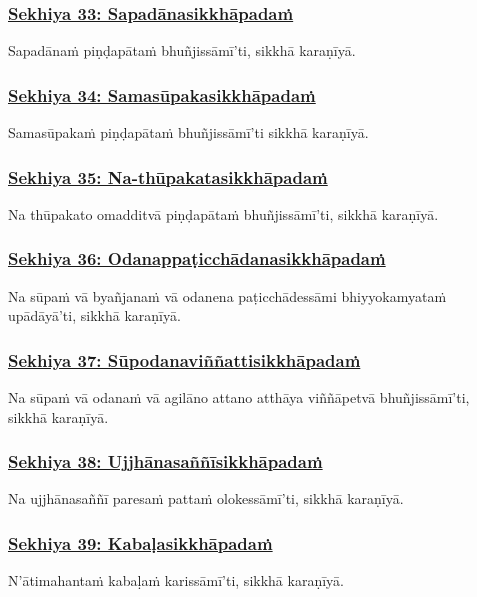 \subsubsection*{\hyperref[training33]{Sekhiya 33: Sapadānasikkhāpadaṁ}}
\label{sekh33}
Sapadānaṁ piṇḍapātaṁ bhuñjissāmī'ti, sikkhā karaṇīyā.

\subsubsection*{\hyperref[training34]{Sekhiya 34: Samasūpakasikkhāpadaṁ}}
\label{sekh34}
Samasūpakaṁ piṇḍapātaṁ bhuñjissāmī'ti sikkhā karaṇīyā.

\subsubsection*{\hyperref[training35]{Sekhiya 35: Na-thūpakatasikkhāpadaṁ}}
\label{sekh35}
Na thūpakato omadditvā piṇḍapātaṁ bhuñjissāmī'ti, sikkhā karaṇīyā.

\subsubsection*{\hyperref[training36]{Sekhiya 36: Odanappaṭicchādanasikkhāpadaṁ}}
\label{sekh36}
Na sūpaṁ vā byañjanaṁ vā odanena paṭicchādessāmi bhiyyokamyataṁ upādāyā'ti, sikkhā karaṇīyā.

\subsubsection*{\hyperref[training37]{Sekhiya 37: Sūpodanaviññattisikkhāpadaṁ}}
\label{sekh37}
Na sūpaṁ vā odanaṁ vā agilāno attano atthāya viññāpetvā bhuñjissāmī'ti, sikkhā karaṇīyā.

\subsubsection*{\hyperref[training38]{Sekhiya 38: Ujjhānasaññīsikkhāpadaṁ}}
\label{sekh38}
Na ujjhānasaññī paresaṁ pattaṁ olokessāmī'ti, sikkhā karaṇīyā.

\subsubsection*{\hyperref[training39]{Sekhiya 39: Kabaḷasikkhāpadaṁ}}
\label{sekh39}
N'ātimahantaṁ kabaḷaṁ karissāmī'ti, sikkhā karaṇīyā.

